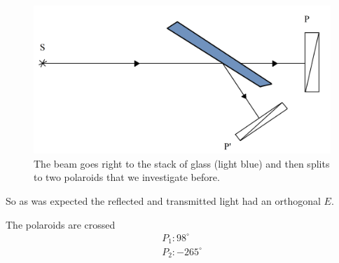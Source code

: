 \begin{minipage}{0.55\textwidth}
    \begin{figure}[h]
    \centering
    \includegraphics[width=1\textwidth]{images/stoletov.png}
    \caption{The beam goes right to the stack of glass (light blue) and then splits to two polaroids that we investigate before.}
\end{figure}
\end{minipage}
\hfill
\begin{minipage}{0.35\textwidth}
    So as was expected the reflected and transmitted light had an orthogonal $E$.

    The polaroids are crossed
    \begin{align*}
    	&P_1 \colon 98^\circ&\\
    	&P_2 \colon -265^\circ&
    \end{align*}
\end{minipage}
